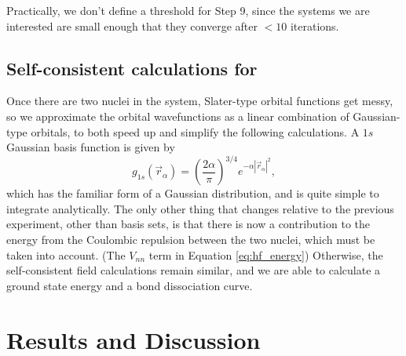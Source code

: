 \documentclass[journal=jacsat,manuscript=communication]{achemso}
\begin{document}
Practically, we don't define a threshold for Step 9, since the systems we are interested are small enough that they converge after $<10$ iterations. 


\subsection{Self-consistent calculations for }
Once there are two nuclei in the system, Slater-type orbital functions get messy, so we approximate the orbital wavefunctions as a linear combination of Gaussian-type orbitals, to both speed up and simplify the following calculations.  A $1s$ Gaussian basis function is given by
\begin{equation}
	g_{1s}(\vec{r}_\alpha)=\left(\frac{2\alpha}{\pi}\right)^{3/4}e^{-\alpha|\vec{r}_\alpha|^2},
\end{equation}
which has the familiar form of a Gaussian distribution, and is quite simple to integrate analytically.  The only other thing that changes relative to the previous experiment, other than basis sets, is that there is now a contribution to the energy from the Coulombic repulsion between the two nuclei, which must be taken into account. (The $V_{nn}$ term in Equation \ref{eq:hf_energy})  Otherwise, the self-consistent field calculations remain similar, and we are able to calculate a ground state energy and a bond dissociation curve.
\section{Results and Discussion}
\end{document}
